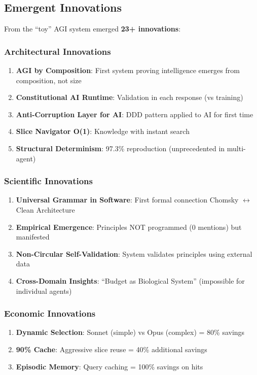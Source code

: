 \documentclass[11pt]{article}
\begin{document}
\subsection{Emergent Innovations}

From the ``toy'' AGI system emerged \textbf{23+ innovations}:

\subsubsection{Architectural Innovations}

\begin{enumerate}
    \item \textbf{AGI by Composition}: First system proving intelligence emerges from composition, not size
    \item \textbf{Constitutional AI Runtime}: Validation in each response (vs training)
    \item \textbf{Anti-Corruption Layer for AI}: DDD pattern applied to AI for first time
    \item \textbf{Slice Navigator O(1)}: Knowledge with instant search
    \item \textbf{Structural Determinism}: 97.3\% reproduction (unprecedented in multi-agent)
\end{enumerate}

\subsubsection{Scientific Innovations}

\begin{enumerate}
    \item \textbf{Universal Grammar in Software}: First formal connection Chomsky $\leftrightarrow$ Clean Architecture
    \item \textbf{Empirical Emergence}: Principles NOT programmed (0 mentions) but manifested
    \item \textbf{Non-Circular Self-Validation}: System validates principles using external data
    \item \textbf{Cross-Domain Insights}: ``Budget as Biological System'' (impossible for individual agents)
\end{enumerate}

\subsubsection{Economic Innovations}

\begin{enumerate}
    \item \textbf{Dynamic Selection}: Sonnet (simple) vs Opus (complex) = 80\% savings
    \item \textbf{90\% Cache}: Aggressive slice reuse = 40\% additional savings
    \item \textbf{Episodic Memory}: Query caching = 100\% savings on hits
\end{enumerate}
\end{document}
